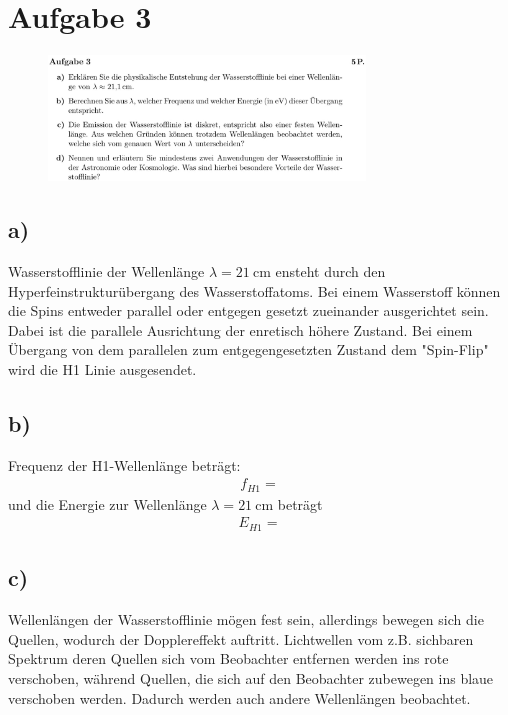 \section{Aufgabe 3}

\begin{figure}[H]
    \centering
    \includegraphics[width=0.75\textwidth]{images/Aufgabe_3.jpg}
    \label{fig:3}
\end{figure}

\subsection{a)}

\justifying Wasserstofflinie der Wellenlänge $\lambda = \SI{21}{\centi\meter} $ ensteht durch den
Hyperfeinstrukturübergang des Wasserstoffatoms. Bei einem Wasserstoff können
die Spins entweder parallel oder entgegen gesetzt zueinander ausgerichtet sein.
Dabei ist die parallele Ausrichtung der enretisch höhere Zustand. Bei einem
Übergang von dem parallelen zum entgegengesetzten Zustand dem "Spin-Flip" wird
die H1 Linie ausgesendet.


\subsection{b)}

\justifying Frequenz der H1-Wellenlänge beträgt:
\begin{align*}
    f_{H1}=\text{}
\end{align*}
und die Energie zur Wellenlänge $\lambda = \SI{21}{\centi\meter} $ beträgt
\begin{align}
    E_{H1}=\text{}
\end{align}


\subsection{c)}

\justifying Wellenlängen der Wasserstofflinie mögen fest sein, allerdings bewegen sich
die Quellen, wodurch der Dopplereffekt auftritt. Lichtwellen vom z.B. sichbaren Spektrum deren Quellen sich vom
Beobachter entfernen werden ins rote verschoben, während Quellen, die sich auf den
Beobachter zubewegen ins blaue verschoben werden. Dadurch werden auch andere Wellenlängen  
beobachtet. 


